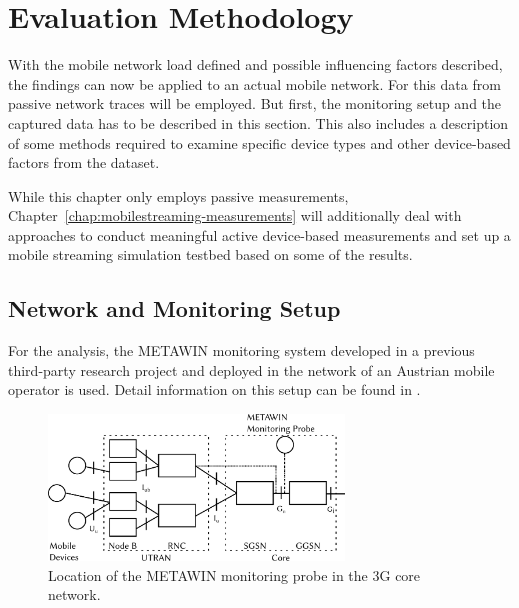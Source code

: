 \section{Evaluation Methodology}
\label{c4:sec:methodology}

With the mobile network load defined and possible influencing factors described, the findings can now be applied to an actual mobile network. For this data from passive network traces will be employed. But first, the monitoring setup and the captured data has to be described in this section. This also includes a description of some methods required to examine specific device types and other device-based factors from the dataset.

While this chapter only employs passive measurements, Chapter~\ref{chap:mobilestreaming-measurements} will additionally deal with approaches to conduct meaningful active device-based measurements and set up a mobile streaming simulation testbed based on some of the results.


\subsection{Network and Monitoring Setup}

For the analysis, the \acrshort{METAWIN} monitoring system developed in a previous third-party research project and deployed in the network of an Austrian mobile operator is used. Detail information on this setup can be found in \cite{ricciato_2011,ricciato2006traffic}.

\begin{figure}[htb]
	\centering
	\includegraphics[width=0.7\textwidth]{images/umts-network.pdf}
	\caption{Location of the \acrshort{METAWIN} monitoring probe in the \acrshort{3G} core network.}
\label{c4:fig:umtsnetwork}
\end{figure}

